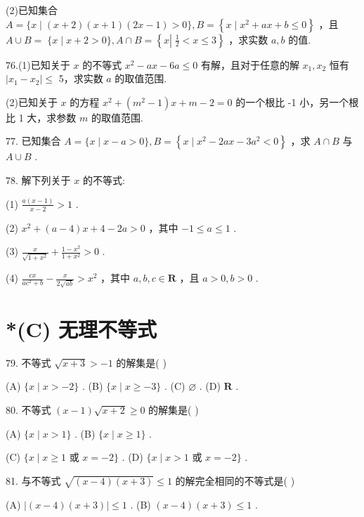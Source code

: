 \documentclass[10pt]{article}
\begin{document}
(2)已知集合 \(A = \{ x \mid  \left( {x + 2}\right) \left( {x + 1}\right) \left( {{2x} - 1}\right)  > 0\} ,B = \left\{  {x \mid  {x}^{2} + {ax} + b \leq  0}\right\}\) ，且 \(A \cup  B = \; \{ x \mid  x + 2 > 0\} ,A \cap  B = \left\{  {x\left| {\;\frac{1}{2} < x \leq  3}\right. }\right\}\) ，求实数 \(a,b\) 的值.

76.(1)已知关于 \(x\) 的不等式 \({x}^{2} - {ax} - {6a} \leq  0\) 有解，且对于任意的解 \({x}_{1},{x}_{2}\) 恒有 \(\left| {{x}_{1} - {x}_{2}}\right|  \leq\) 5，求实数 \(a\) 的取值范围.

(2)已知关于 \(x\) 的方程 \({x}^{2} + \left( {{m}^{2} - 1}\right) x + m - 2 = 0\) 的一个根比 -1 小，另一个根比 1 大，求参数 \(m\) 的取值范围.

77. 已知集合 \(A = \{ x \mid  x - a > 0\} ,B = \left\{  {x \mid  {x}^{2} - {2ax} - 3{a}^{2} < 0}\right\}\) ，求 \(A \cap  B\) 与 \(A \cup  B\) .

78. 解下列关于 \(x\) 的不等式:

(1) \(\frac{a\left( {x - 1}\right) }{x - 2} > 1\) .

(2) \({x}^{2} + \left( {a - 4}\right) x + 4 - {2a} > 0\) ，其中 \(- 1 \leq  a \leq  1\) .

(3) \(\frac{x}{\sqrt{1 + {x}^{2}}} + \frac{1 - {x}^{2}}{1 + {x}^{2}} > 0\) .

(4) \(\frac{cx}{a{c}^{2} + b} - \frac{x}{2\sqrt{ab}} > {x}^{2}\) ，其中 \(a,b,c \in  \mathbf{R}\) ，且 \(a > 0,b > 0\) .

\section*{*(C) 无理不等式}

79. 不等式 \(\sqrt{x + 3} >  - 1\) 的解集是( )

(A) \(\{ x \mid  x >  - 2\}\) . (B) \(\{ x \mid  x \geq   - 3\}\) . (C) \(\varnothing\) . (D) \(\mathbf{R}\) .

80. 不等式 \(\left( {x - 1}\right) \sqrt{x + 2} \geq  0\) 的解集是( )

(A) \(\{ x \mid  x > 1\}\) . (B) \(\{ x \mid  x \geq  1\}\) .

(C) \(\{ x \mid  x \geq  1\) 或 \(x =  - 2\}\) . (D) \(\{ x \mid  x > 1\) 或 \(x =  - 2\}\) .

81. 与不等式 \(\sqrt{\left( {x - 4}\right) \left( {x + 3}\right) } \leq  1\) 的解完全相同的不等式是( )

(A) \(\left| {\left( {x - 4}\right) \left( {x + 3}\right) }\right|  \leq  1\) . (B) \(\left( {x - 4}\right) \left( {x + 3}\right)  \leq  1\) .
\end{document}

